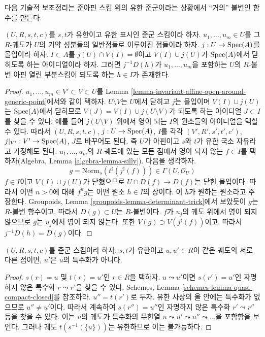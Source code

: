 \noindent
다음 기술적 보조정리는 준아핀 스킴 위의 유한 준군이라는 상황에서
``거의'' 불변인 함수를 만든다.

\begin{lemma}
\label{lemma-find-almost-invariant-function}
$(U, R, s, t, c)$를 $s, t$가 유한이고 유한 표시인 준군 스킴이라 하자.
$u_1, \ldots, u_m \in U$를 그 $R$-궤도가 $U$의 기약 성분들의 일반점들로
이루어진 점들이라 하자. $j : U \to \mathop{\mathrm{Spec}}(A)$를 몰입이라 하자.
$I \subset A$를 $j(U) \cap V(I) = \emptyset$이고
$V(I) \cup j(U)$가 $\mathop{\mathrm{Spec}}(A)$에서 닫히도록 하는 아이디얼이라 하자.
그러면 $j^{-1}D(h)$가 $u_1, \ldots, u_m$을 포함하는 $U$의 $R$-불변
아핀 열린 부분스킴이 되도록 하는 $h \in I$가 존재한다.
\end{lemma}

\begin{proof}
$u_1, \ldots, u_m \in V' \subset V \subset U$를 Lemma
\ref{lemma-invariant-affine-open-around-generic-point}에서와 같이 택하자.
$U \setminus V$는 $U$에서 닫히고 $j$는 몰입이며
$V(I) \cup j(U)$는 $\mathop{\mathrm{Spec}}(A)$에서 닫히므로
$V(J) = V(I) \cup j(U \setminus V)$가 되도록 하는 아이디얼
$J \subset I$를 찾을 수 있다. 예를 들어 $j(U \setminus V)$ 위에서
영이 되는 $I$의 원소들의 아이디얼을 택할 수 있다. 따라서
$(U, R, s, t, c)$, $j : U \to \mathop{\mathrm{Spec}}(A)$, $I$를 각각
$(V', R', s', t', c')$, $j|_{V'} : V' \to \mathop{\mathrm{Spec}}(A)$, $J$로 바꾸어도 된다.
즉 $U$가 아핀이고 $s$와 $t$가 유한 국소 자유라고 가정해도 된다.
$u_1, \ldots, u_m$의 $R$-궤도에 있는 모든 점에서 영이 되지 않는
$f \in I$를 택하자(Algebra, Lemma \ref{algebra-lemma-silly}). 다음을 생각하자.
$$
g = \text{Norm}_s(t^\sharp(j^\sharp(f))) \in \Gamma(U, \mathcal{O}_U)
$$
$f \in I$이고 $V(I) \cup j(U)$가 닫혔으므로
$U \cap D(f) \to D(f)$는 닫힌 몰입이다. 따라서 어떤 $n > 0$에 대해
$f^ng$는 어떤 원소 $h \in I$의 상이다. 이 $h$가 원하는 원소라고 주장한다.
Groupoids, Lemma \ref{groupoids-lemma-determinant-trick}에서 보았듯이 $g$는
$R$-불변 함수이고, 따라서 $D(g) \subset U$는 $R$-불변이다. $f$가 $u_j$의
궤도 위에서 영이 되지 않으므로 $g$는 $u_j$에서 영이 되지 않는다. 또한
$V(g) \supset V(j^\sharp(f))$이고, 따라서 $j^{-1}D(h) = D(g)$이다.
\end{proof}

\begin{lemma}
\label{lemma-no-specializations-map-to-same-point}
$(U, R, s, t, c)$를 준군 스킴이라 하자. $s, t$가 유한이고
$u, u' \in R$이 같은 궤도의 서로 다른 점이면, $u'$은 $u$의 특수화가 아니다.
\end{lemma}

\begin{proof}
$s(r) = u$ 및 $t(r) = u'$인 $r \in R$을 택하자. $u \leadsto u'$이면
$s(r') = u'$인 자명하지 않은 특수화 $r \leadsto r'$을 찾을 수 있다.
Schemes, Lemma \ref{schemes-lemma-quasi-compact-closed}를 참조하라.
$u'' = t(r')$로 두자. 유한 사상의 올 안에는 특수화가 없으므로
$u'' \not = u'$이다. 따라서 계속하여 $s(r'') = u''$인 자명하지 않은 특수화
$r' \leadsto r''$ 등을 찾을 수 있다. 이는 $u$의 궤도가 특수화의 무한열
$u \leadsto u' \leadsto u'' \leadsto \ldots$을 포함함을 보인다.
그러나 궤도 $t(s^{-1}(\{u\}))$는 유한하므로 이는 불가능하다.
\end{proof}

